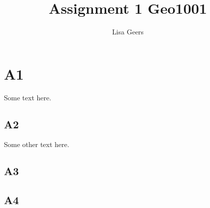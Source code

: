 \documentclass{article}
\title{Assignment 1 Geo1001}
\author{Lisa Geers}
\begin{document}
\maketitle

\section{A1}

Some text here.

\subsection{A2}

Some other text here.

\subsection{A3}

\subsection{A4}
\end{document}
